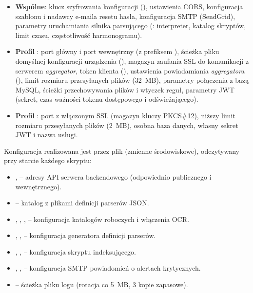 \begin{itemize}[leftmargin=1.6em]
  \item \textbf{Wspólne}: klucz szyfrowania konfiguracji (), ustawienia CORS,
        konfiguracja szablonu i nadawcy e-maila resetu hasła, konfiguracja SMTP (SendGrid),
        parametry uruchamiania silnika parsującego (: interpreter, katalog
        skryptów, limit czasu, częstotliwość harmonogramu).
  \item \textbf{Profil }: port główny  i port wewnętrzny 
        (z prefiksem ), ścieżka pliku domyślnej konfiguracji urządzenia
        (), magazyn zaufania SSL do komunikacji z serwerem \emph{aggregator},
        token klienta (), ustawienia powiadamiania \emph{aggregator}a
        (), limit rozmiaru przesyłanych plików (32~MB), parametry
        połączenia z bazą MySQL, ścieżki przechowywania plików i wtyczek reguł, parametry JWT
        (sekret, czas ważności tokenu dostępowego i odświeżającego).
  \item \textbf{Profil }: port  z włączonym SSL (magazyn kluczy
        PKCS\#12), niższy limit rozmiaru przesyłanych plików (2~MB), osobna baza danych, własny
        sekret JWT i nazwa usługi.
\end{itemize}


Konfiguracja realizowana jest przez plik  (zmienne środowiskowe), odczytywany przy
starcie każdego skryptu:

\begin{itemize}[leftmargin=1.6em]
  \item {},  -- adresy API serwera backendowego (odpowiednio
        publicznego i wewnętrznego).
  \item {} -- katalog z plikami definicji parserów JSON.
  \item {}, , ,  -- konfiguracja
        katalogów roboczych i włączenia OCR.
  \item {}, , 
        -- konfiguracja generatora definicji parserów.
  \item {}, ,  --
        konfiguracja skryptu indeksującego.
  \item {}, , 
        -- konfiguracja SMTP powiadomień o alertach krytycznych.
  \item {} -- ścieżka pliku logu (rotacja co 5~MB, 3 kopie zapasowe).
\end{itemize}

